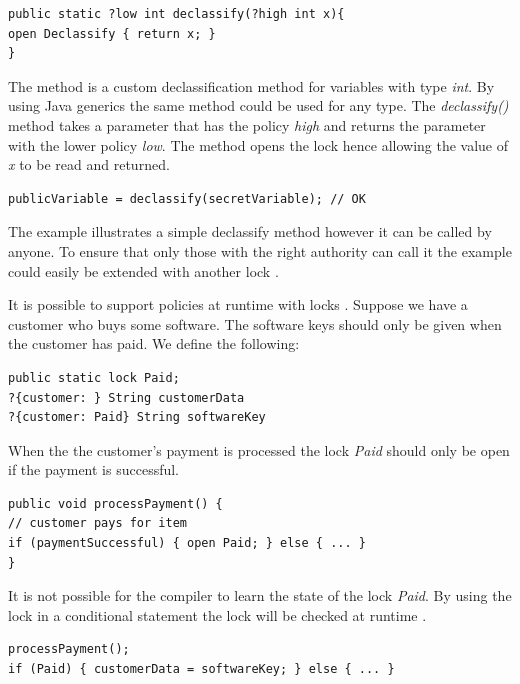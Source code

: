 \begin{lstlisting}
public static ?low int declassify(?high int x){
open Declassify { return x; } 
}
\end{lstlisting} 

The method is a custom declassification method for variables with type \emph{int}. By using Java generics the same method could be used for any type. The \emph{declassify()} method takes a parameter that has the policy \emph{high} and returns the parameter with the lower policy \emph{low}. The method opens the lock hence allowing the value of \emph{x} to be read and returned. 

\begin{lstlisting}
publicVariable = declassify(secretVariable); // OK
\end{lstlisting} 


The example illustrates a simple declassify method however it can be called by anyone. To ensure that only those with the right authority can call it the example could easily be extended with another lock \cite{paralocks}. 

It is possible to support policies at runtime with locks \cite{paragonprogramming}. Suppose we have a customer who buys some software. The software keys should only be given when the customer has paid. We define the following:

\begin{lstlisting}
public static lock Paid;
?{customer: } String customerData
?{customer: Paid} String softwareKey
\end{lstlisting}

When the the customer's payment is processed the lock \emph{Paid} should only be open if the payment is successful. 

\begin{lstlisting}
public void processPayment() {
// customer pays for item
if (paymentSuccessful) { open Paid; } else { ... }
}
\end{lstlisting}

It is not possible for the compiler to learn the state of the lock \emph{Paid}. By using the lock in a conditional statement the lock will be checked at runtime \cite{paragonprogramming}.

\begin{lstlisting}
processPayment();
if (Paid) { customerData = softwareKey; } else { ... }
\end{lstlisting}   

